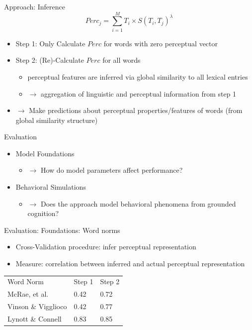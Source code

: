 \documentclass[12pt,a4paper]{beamer}
\begin{document}
\begin{frame}{Approach: Inference}
$$ Perc_{j} = \sum_{i=1}^{M}{T_{i} \times S(T_{i}, T_{j})^{\lambda} } $$
\begin{itemize}
\item Step 1: Only Calculate $Perc$ for words with zero perceptual vector
\item Step 2: (Re)-Calculate $Perc$ for all words
    \begin{itemize}
    \item perceptual features are inferred via global similarity to all lexical entries
    \item $\to$ aggregation of linguistic and perceptual information from step 1
    \end{itemize}
\item $\to$ Make predictions about perceptual properties/features of words (from global similarity structure)
\end{itemize}
\end{frame}




\begin{frame}{Evaluation}
\begin{itemize}
    \item Model Foundations
        \begin{itemize}
        \item $\to$ How do model parameters affect performance?
        \end{itemize}
    \item Behavioral Simulations
        \begin{itemize}
        \item $\to$ Does the approach model behavioral phenomena from grounded cognition?
        \end{itemize}
\end{itemize}
\end{frame}

\begin{frame}{Evaluation: Foundations: Word norms}
\begin{itemize}
\item Cross-Validation procedure: infer perceptual representation
\item Measure: correlation between inferred and actual perceptual representation
\end{itemize}
\begin{table}
    \begin{tabular}{lll}
    Word Norm          & Step 1 & Step 2 \\
    McRae, et al.      & 0.42   & 0.72   \\
    Vinson \& Vigglioco & 0.42   & 0.77   \\
    Lynott \& Connell   & 0.83   & 0.85   \\
    \end{tabular}
\end{table}
\end{frame}
\end{document}
